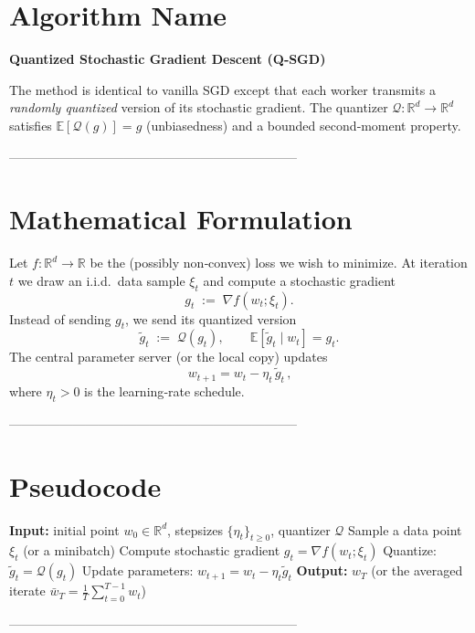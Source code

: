 \documentclass{article}
\newcommand{\E}{\mathbb{E}}
\newcommand{\Q}{\mathcal{Q}}
\begin{document}
\section*{Algorithm Name}
\textbf{Quantized Stochastic Gradient Descent (Q‑SGD)}  

The method is identical to vanilla SGD except that each worker transmits a \emph{randomly quantized} version of its stochastic gradient. The quantizer $\Q:\mathbb{R}^d\to\mathbb{R}^d$ satisfies $\E[\Q(g)]=g$ (unbiasedness) and a bounded second‑moment property.

--------------------------------------------------------------------

\section*{Mathematical Formulation}
Let $f:\mathbb{R}^d\rightarrow\mathbb{R}$ be the (possibly non‑convex) loss we wish to minimize.
At iteration $t$ we draw an i.i.d.\ data sample $\xi_t$ and compute a stochastic gradient
\[
g_t \;:=\; \nabla f(w_t;\xi_t).
\]
Instead of sending $g_t$, we send its quantized version
\[
\tilde g_t \;:=\; \Q(g_t),\qquad \E[\tilde g_t\mid w_t]=g_t .
\]
The central parameter server (or the local copy) updates
\[
\boxed{\,w_{t+1}=w_t-\eta_t\,\tilde g_t\,},
\]
where $\eta_t>0$ is the learning‑rate schedule.

--------------------------------------------------------------------

\section*{Pseudocode}
\begin{algorithm}[H]
\caption{Quantized SGD}
\begin{algorithmic}[1]
\STATE \textbf{Input:} initial point $w_0\in\mathbb{R}^d$, stepsizes $\{\eta_t\}_{t\ge 0}$, quantizer $\Q$
    \STATE Sample a data point $\xi_t$ (or a minibatch)  
    \STATE Compute stochastic gradient $g_t=\nabla f(w_t;\xi_t)$
    \STATE Quantize: $\tilde g_t=\Q(g_t)$   \hfill\Comment{Unbiased: $\E[\tilde g_t|w_t]=g_t$}
    \STATE Update parameters: $w_{t+1}=w_t-\eta_t\tilde g_t$
\ENDFOR
\STATE \textbf{Output:} $w_T$ (or the averaged iterate $\bar w_T=\frac1T\sum_{t=0}^{T-1}w_t$)
\end{algorithmic}
\end{algorithm}

--------------------------------------------------------------------
\end{document}
